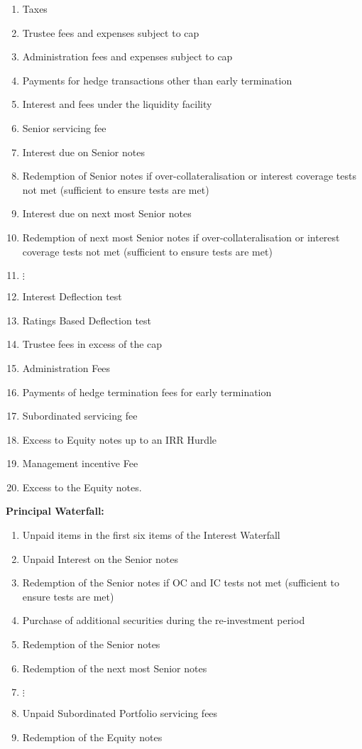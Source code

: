 {\begin{enumerate}
\item Taxes
\item Trustee fees and expenses subject to cap
\item  Administration fees and expenses subject to cap
\item Payments for hedge transactions  other than early termination
\item Interest and fees under the liquidity facility
\item Senior servicing fee
\item Interest due on Senior notes
\item Redemption of Senior notes if over-collateralisation or interest coverage tests not met (sufficient to ensure tests are met)
\item Interest due on next most Senior notes
\item Redemption of next most Senior notes if over-collateralisation or interest coverage tests not met (sufficient to ensure tests are met)
\item $\vdots$
\item Interest Deflection test
\item Ratings Based Deflection test
\item Trustee fees in excess of the cap
\item Administration Fees
\item Payments of hedge termination fees for early termination
\item Subordinated servicing fee
\item Excess to Equity notes up to an IRR Hurdle
\item Management incentive Fee
\item Excess to the Equity notes.
\end{enumerate}

\medskip
{\bf Principal Waterfall:}

\begin{enumerate}
\item Unpaid items in the first six items of the Interest Waterfall
\item Unpaid Interest on the Senior notes
\item Redemption of the Senior notes if OC and IC tests not met (sufficient to ensure tests are met)
\item Purchase of additional securities during the re-investment period
\item Redemption of the Senior notes
\item Redemption of the next most Senior notes
\item $\vdots$
\item Unpaid Subordinated Portfolio servicing fees
\item Redemption of the Equity notes
\end{enumerate}

}
